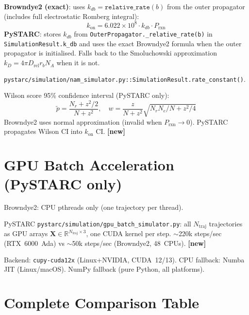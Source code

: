 \documentclass[12pt,a4paper]{article}
\newcommand{\kon}{k_{\mathrm{on}}}
\newcommand{\OK}{\textcolor{cgreen}{\checkmark}}
\newcommand{\NEW}{\textcolor{cblue}{\textbf{[new]}}}
\begin{document}
\begin{samebox}
\textbf{Browndye2 (exact)}: uses $k_{db} = \texttt{relative\_rate}(b)$ from the outer
propagator (includes full electrostatic Romberg integral):
\begin{equation}
\kon = 6.022\times10^8 \cdot k_{db} \cdot P_\mathrm{rxn}
\end{equation}
\textbf{PySTARC}: stores $k_{db}$ from \texttt{OuterPropagator.\_relative\_rate(b)}
in \texttt{SimulationResult.k\_db} and uses the exact Browndye2 formula
when the outer propagator is initialised. Falls back to the Smoluchowski
approximation $k_D = 4\pi D_\mathrm{rel} r_b N_A$ when it is not.

\texttt{pystarc/simulation/nam\_simulator.py::SimulationResult.rate\_constant()}. \OK
\end{samebox}

\begin{improvebox}
Wilson score 95\% confidence interval (PySTARC only):
\begin{equation}
\tilde{p}=\frac{N_r+z^2/2}{N+z^2},\quad
w=\frac{z}{N+z^2}\sqrt{N_r N_e/N+z^2/4}
\end{equation}
Browndye2 uses normal approximation (invalid when $P_\mathrm{rxn}\to0$).
PySTARC propagates Wilson CI into $\kon$ CI. \NEW
\end{improvebox}

\section{GPU Batch Acceleration (PySTARC only)}

\begin{improvebox}
Browndye2: CPU pthreads only (one trajectory per thread).

PySTARC \texttt{pystarc/simulation/gpu\_batch\_simulator.py}:
all $N_\mathrm{traj}$ trajectories as GPU arrays
$\mathbf{X}\in\mathbb{R}^{N_\mathrm{traj}\times3}$, one CUDA kernel per step.
$\sim$220k steps/sec (RTX~6000~Ada) vs $\sim$50k steps/sec (Browndye2, 48~CPUs). \NEW

Backend: \texttt{cupy-cuda12x} (Linux+NVIDIA, CUDA~12/13).
CPU fallback: Numba JIT (Linux/macOS). NumPy fallback (pure Python, all platforms).
\end{improvebox}

\section{Complete Comparison Table}
\end{document}
